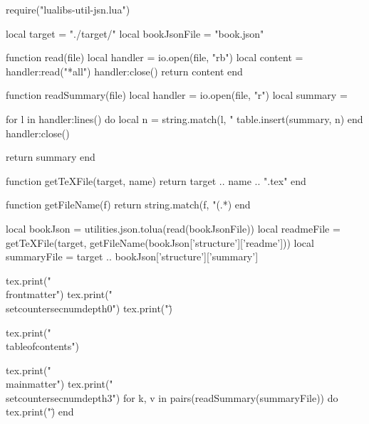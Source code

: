 \documentclass[10pt, a4, oneside]{ltjsbook}
\begin{document}
\begin{luacode*}
  require("lualibs-util-jsn.lua")

  local target = "./target/"
  local bookJsonFile = "book.json"

  function read(file)
    local handler = io.open(file, "rb")
    local content = handler:read("*all")
    handler:close()
    return content
  end

  function readSummary(file)
    local handler = io.open(file, "r")
    local summary = {}

    for l in handler:lines() do
      local n = string.match(l, "%
      table.insert(summary, n)
    end
    handler:close()

    return summary
  end

  function getTeXFile(target, name)
    return target .. name .. ".tex"
  end

  function getFileName(f)
    return string.match(f, "(.*)%
  end

  local bookJson = utilities.json.tolua(read(bookJsonFile))
  local readmeFile  = getTeXFile(target, getFileName(bookJson['structure']['readme']))
  local summaryFile = target .. bookJson['structure']['summary']

  tex.print("\\frontmatter")
  tex.print("\\setcounter{secnumdepth}{0}")
  tex.print("\")

  tex.print("\\tableofcontents")

  tex.print("\\mainmatter")
  tex.print("\\setcounter{secnumdepth}{3}")
  for k, v in pairs(readSummary(summaryFile)) do
    tex.print("\")
  end
\end{luacode*}
\end{document}
